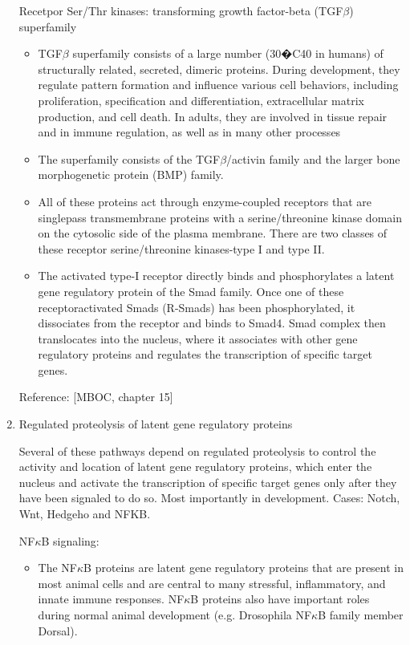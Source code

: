 \documentclass{report}
\begin{document}
\begin{enumerate}
Recetpor Ser/Thr kinases: transforming growth factor-beta (TGF$\beta$) superfamily
\begin{itemize}
	\item TGF$\beta$ superfamily consists of a large number (30�C40 in humans) of structurally related, secreted, dimeric proteins. During development, they regulate pattern formation and influence various cell behaviors, including proliferation, specification and differentiation, extracellular matrix production, and cell death. In adults, they are involved in tissue repair and in immune regulation, as well as in many other processes
	\item The superfamily consists of the TGF$\beta$/activin family and the larger bone morphogenetic protein (BMP) family. 
	\item All of these proteins act through enzyme-coupled receptors that are singlepass transmembrane proteins with a serine/threonine kinase domain on the cytosolic side of the plasma membrane. There are two classes of these receptor serine/threonine kinases-type I and type II. 
	\item The activated type-I receptor directly binds and phosphorylates a latent gene regulatory protein of the Smad family. Once one of these receptoractivated Smads (R-Smads) has been phosphorylated, it dissociates from the receptor and binds to Smad4. Smad complex then translocates into the nucleus, where it associates with other gene regulatory proteins and regulates the transcription of specific target genes. 
\end{itemize}

Reference: [MBOC, chapter 15] 

\item{Regulated proteolysis of latent gene regulatory proteins}

Several of these pathways depend on regulated proteolysis to control the activity and location of latent gene regulatory proteins, which enter the nucleus and activate the transcription of specific target genes only after they have been signaled to do so. Most importantly in development. Cases: Notch, Wnt, Hedgeho and NFKB. 

NF$\kappa$B signaling: 
\begin{itemize}
	\item The NF$\kappa$B proteins are latent gene regulatory proteins that are present in most animal cells and are central to many stressful, inflammatory, and innate immune responses. NF$\kappa$B proteins also have important roles during normal animal development (e.g. Drosophila NF$\kappa$B family member Dorsal).
	 

\end{itemize}
\end{enumerate}
\end{document}
